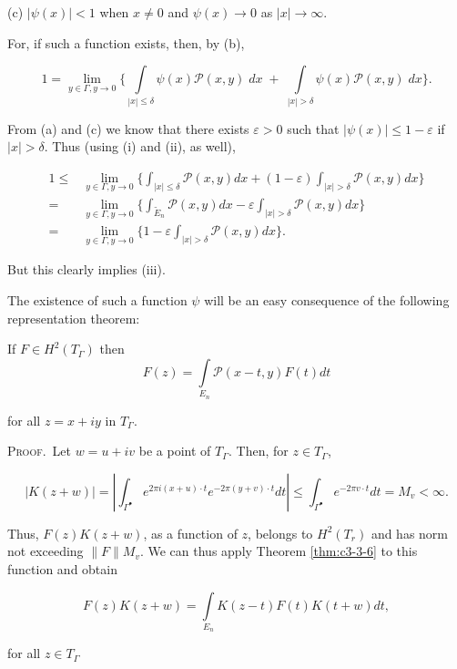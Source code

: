 (c) $|\psi(x)| < 1$ when $x \neq 0$ and $\psi(x) \to 0$ as $|x| \to \infty$.

For, if such a function exists, then, by (b),

\[
1=\lim_{y\in\Gamma, y\to0}\Bigg\{\int\limits_{|x|\leq\delta}\psi(x)\mathcal{P}(x,y)\;{d}x\;+\;\int\limits_{|x|>\delta}\psi(x)\mathcal{P}(x,y)\;{d}x\Bigg\}.
\]

From (a) and (c) we know that there exists $\varepsilon > 0$ such that $|\psi(x)| \leq 1 - \varepsilon$ if $|x| > \delta$. Thus (using (i) and (ii), as well),

\[
\begin{aligned}1\leq&\lim_{y\in\Gamma,y\to0}\Biggl\{\int_{|x|\leq\delta}\mathcal{P}(x,y)dx+(1-\varepsilon)\int_{|x|>\delta}\mathcal{P}(x,y)dx\Biggr\}\\=&\lim_{y\in\Gamma,y\to0}\Biggl\{\int_{\widetilde{E}_{n}}\mathcal{P}(x,y)dx-\varepsilon\int_{|x|>\delta}\mathcal{P}(x,y)dx\Biggr\}\\=&\lim_{y\in\Gamma,y\to0}\Biggl\{1-\varepsilon\int_{|x|>\delta}\mathcal{P}(x,y)dx\Biggr\}.\end{aligned}
\]

But this clearly implies (iii).

The existence of such a function $\psi$ will be an easy consequence of the following representation theorem:

\begin{theorem}
\label{thm:c3-3-9}
If $F \in H^2(T_\Gamma)$ then
\[
F(z)=\int\limits_{E_{n}}\mathcal{P}(x-t,y)F(t)dt
\]

for all $z = x + iy$ in $T_{\Gamma}$.
\end{theorem}

\textsc{Proof.}\ Let $w = u + iv$ be a point of $T_{\Gamma}$. Then, for $z \in T_{\Gamma}$,

\[
|K(z+w)|=\left|\int_{\Gamma^{\bullet}}e^{2\pi i(x+u)\cdot t}e^{-2\pi(y+v)\cdot t}d t\right|\leq\int_{\Gamma^{\bullet}}e^{-2\pi v\cdot t}d t=M_{v}<\infty.
\]

Thus, $F(z)K(z + w)$, as a function of $z$, belongs to $H^2(T_r)$ and has norm not exceeding $\|F\|M_v$. We can thus apply Theorem \ref{thm:c3-3-6} to this function and obtain

\begin{equation}\label{eq:c3-3-10}
F(z)K(z+w)=\int\limits_{E_{n}}K(z-t)F(t)K(t+w)d t,
\end{equation}

for all $z \in T_{\Gamma}$

